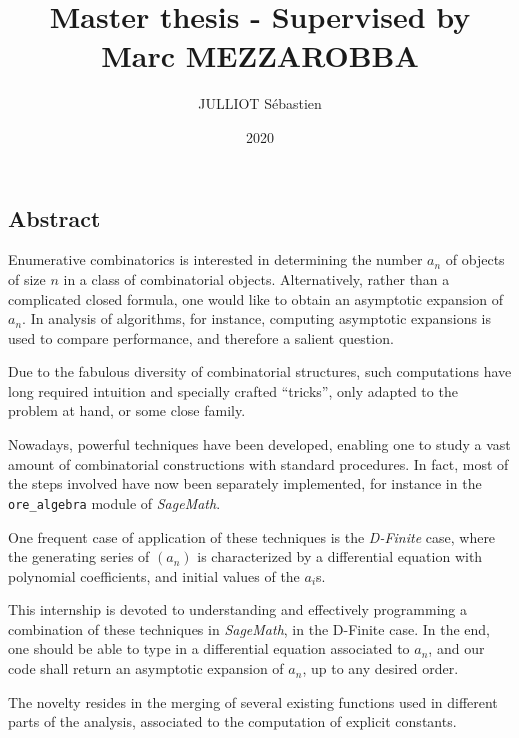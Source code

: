 \documentclass[a4paper, 12pt]{report}
\author{JULLIOT Sébastien}
\date{2020}
\title{Master thesis -	Supervised by Marc MEZZAROBBA}
\begin{document}


\clearpage
\vspace*{\fill}
\begin{center}
	\begin{minipage}{.8\textwidth}
		\begin{center}{\section*{Abstract}}\end{center}
		Enumerative combinatorics is interested in determining the number $a_n$ of objects of size $n$ in a class of combinatorial objects. Alternatively, rather than a complicated closed formula, one would like to obtain an asymptotic expansion of $a_n$. In analysis of algorithms, for instance, computing asymptotic expansions is used to compare performance, and therefore a salient question.

		Due to the fabulous diversity of combinatorial structures, such computations have long required intuition and specially crafted ``tricks'', only adapted to the problem at hand, or some close family.

		Nowadays, powerful techniques have been developed, enabling one to study a vast amount of combinatorial constructions with standard procedures. In fact, most of the steps involved have now been separately implemented, for instance in the \verb|ore_algebra| module of \textit{SageMath}.

		One frequent case of application of these techniques is the \textit{D-Finite} case, where the generating series of $(a_n)$ is characterized by a differential equation with polynomial coefficients, and initial values of the $a_i$s.

		This internship is devoted to understanding and effectively programming a combination of these techniques in \textit{SageMath}, in the D-Finite case.
		In the end, one should be able to type in a differential equation associated to $a_n$, and our code shall return an asymptotic expansion of $a_n$, up to any desired order.
		
		The novelty resides in the merging of several existing functions used in different parts of the analysis, associated to the computation of explicit constants. %
	\end{minipage}
\end{center}
\vfill %
\clearpage

\tableofcontents




\printbibliography
\end{document}
